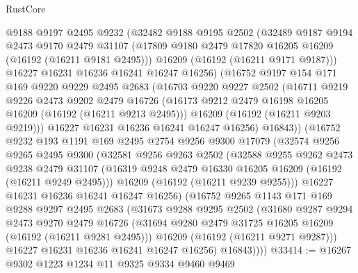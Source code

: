 \begin{lexlean}{RustCore}
\begin{coremodule}
        @9188
        @9197
        @2495
        @9232
        (@32482
          @9188
          @9195
          @2502
          (@32489
            @9187
            @9194
            @2473
            @9170
            @2479
            @31107
            (@17809 @9180 @2479 @17820 @16205 @16209 (@16192 (@16211 @9181 @2495)))
            @16209
            (@16192 (@16211 @9171 @9187)))
          @16227
          @16231
          @16236
          @16241
          @16247
          @16256)
        (@16752
          @9197
          @154
          @171
          @169
          @9220
          @9229
          @2495
          @2683
          (@16703
            @9220
            @9227
            @2502
            (@16711
              @9219
              @9226
              @2473
              @9202
              @2479
              @16726
              (@16173 @9212 @2479 @16198 @16205 @16209 (@16192 (@16211 @9213 @2495)))
              @16209
              (@16192 (@16211 @9203 @9219)))
            @16227
            @16231
            @16236
            @16241
            @16247
            @16256)
          @16843))
      (@16752
        @9232
        @193
        @1191
        @169
        @2495
        @2754
        @9256
        @9300
        @17079
        (@32574
          @9256
          @9265
          @2495
          @9300
          (@32581
            @9256
            @9263
            @2502
            (@32588
              @9255
              @9262
              @2473
              @9238
              @2479
              @31107
              (@16319 @9248 @2479 @16330 @16205 @16209 (@16192 (@16211 @9249 @2495)))
              @16209
              (@16192 (@16211 @9239 @9255)))
            @16227
            @16231
            @16236
            @16241
            @16247
            @16256)
          (@16752
            @9265
            @1143
            @171
            @169
            @9288
            @9297
            @2495
            @2683
            (@31673
              @9288
              @9295
              @2502
              (@31680
                @9287
                @9294
                @2473
                @9270
                @2479
                @16726
                (@31694 @9280 @2479 @31725 @16205 @16209 (@16192 (@16211 @9281 @2495)))
                @16209
                (@16192 (@16211 @9271 @9287)))
              @16227
              @16231
              @16236
              @16241
              @16247
              @16256)
            @16843))))
@33414 := @16267 @9302 @1223 @1234 @11 @9325 @9334 @9460 @9469

\end{coremodule}
\end{lexlean}
